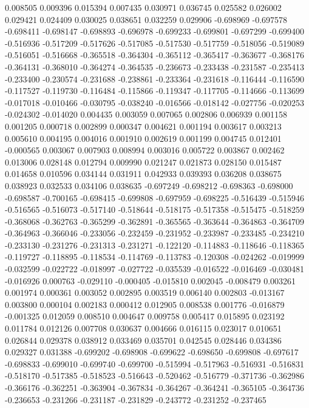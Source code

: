 0.008505
0.009396
0.015394
0.007435
0.030971
0.036745
0.025582
0.026002
0.029421
0.024409
0.030025
0.038651
0.032259
0.029906
-0.698969
-0.697578
-0.698411
-0.698147
-0.698893
-0.696978
-0.699233
-0.699801
-0.697299
-0.699400
-0.516936
-0.517209
-0.517626
-0.517085
-0.517530
-0.517759
-0.518056
-0.519089
-0.516051
-0.516668
-0.365518
-0.364304
-0.365112
-0.365417
-0.363677
-0.368176
-0.364131
-0.368010
-0.364274
-0.364535
-0.236673
-0.233438
-0.231587
-0.235413
-0.233400
-0.230574
-0.231688
-0.238861
-0.233364
-0.231618
-0.116444
-0.116590
-0.117527
-0.119730
-0.116484
-0.115866
-0.119347
-0.117705
-0.114666
-0.113699
-0.017018
-0.010466
-0.030795
-0.038240
-0.016566
-0.018142
-0.027756
-0.020253
-0.024302
-0.014020
0.004435
0.003059
0.007065
0.002806
0.006939
0.001158
0.001205
0.000718
0.002899
0.000347
0.004621
0.001194
0.003617
0.003213
0.005610
0.004195
0.004016
0.001910
0.002619
0.001199
0.004745
0.012401
-0.000565
0.003067
0.007903
0.008994
0.003016
0.005722
0.003867
0.002462
0.013006
0.028148
0.012794
0.009990
0.021247
0.021873
0.028150
0.015487
0.014658
0.010596
0.034144
0.031911
0.042933
0.039393
0.036208
0.038675
0.038923
0.032533
0.034106
0.038635
-0.697249
-0.698212
-0.698363
-0.698000
-0.698587
-0.700165
-0.698415
-0.699808
-0.697959
-0.698225
-0.516439
-0.515946
-0.516565
-0.516073
-0.517140
-0.518644
-0.518175
-0.517358
-0.515475
-0.518259
-0.368068
-0.362763
-0.365299
-0.362891
-0.365565
-0.363644
-0.364863
-0.364709
-0.364963
-0.366046
-0.233056
-0.232459
-0.231952
-0.233987
-0.233485
-0.234210
-0.233130
-0.231276
-0.231313
-0.231271
-0.122120
-0.114883
-0.118646
-0.118365
-0.119727
-0.118895
-0.118534
-0.114769
-0.113783
-0.120308
-0.024262
-0.019999
-0.032599
-0.022722
-0.018997
-0.027722
-0.035539
-0.016522
-0.016469
-0.030481
-0.016926
0.000763
-0.029110
-0.000405
-0.015810
0.002045
-0.008479
0.003261
0.001974
0.000361
0.003052
0.002895
0.003519
0.006140
0.002803
-0.013167
0.003800
0.000104
0.002183
0.000412
0.012905
0.008538
0.001776
-0.016879
-0.001325
0.012059
0.008510
0.004647
0.009758
0.005417
0.015895
0.023192
0.011784
0.012126
0.007708
0.030637
0.004666
0.016115
0.023017
0.010651
0.026844
0.029378
0.038912
0.033469
0.035701
0.042545
0.028446
0.034386
0.029327
0.031388
-0.699202
-0.698908
-0.699622
-0.698650
-0.699808
-0.697617
-0.698833
-0.699010
-0.699740
-0.699700
-0.515994
-0.517963
-0.516931
-0.516831
-0.518170
-0.517385
-0.518523
-0.516643
-0.520462
-0.516779
-0.371736
-0.362986
-0.366176
-0.362251
-0.363904
-0.367834
-0.364267
-0.364241
-0.365105
-0.364736
-0.236653
-0.231266
-0.231187
-0.231829
-0.243772
-0.231252
-0.237465
